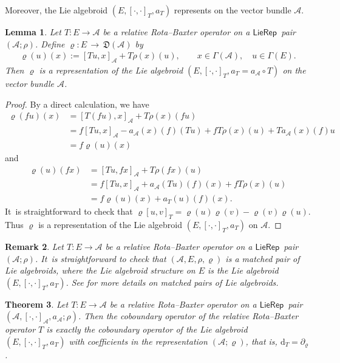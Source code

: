 \documentclass[10pt,a4paper]{amsart}
\numberwithin{equation}{section}
\newtheorem{thm}{Theorem}[section]
\newtheorem{lem}[thm]{Lemma}
\newtheorem{rmk}[thm]{Remark}
\newcommand{\huaA}{\mathcal{A}}
\newcommand{\frkD}{\mathfrak D}
\newcommand{\lon }{\,\rightarrow\,}
\newcommand{\dM}{\mathrm{d}}
\newcommand{\LP}{$\mathsf{LieRep}$~}
\begin{document}
Moreover, the Lie algebroid $(E, [\cdot,\cdot]_{T}, a_T)$ represents on the vector bundle $\huaA$.
\begin{lem}\label{ex:MC-ten}
 Let $T\colon E\longrightarrow \huaA$ be a relative Rota--Baxter operator on a \LP pair $(\huaA;\rho)$. Define $\varrho\colon E\lon\frkD(\huaA)$ by
\begin{gather*}%
\varrho(u)(x):=[Tu,x]_{\huaA}+T\rho(x)(u),\qquad x\in\Gamma{(\huaA)},\quad u\in\Gamma{(E)}.
\end{gather*}
Then $\varrho$ is a representation of the Lie algebroid $(E,[\cdot,\cdot]_{T},a_T=a_{\huaA}\circ T)$ on the vector bundle $\huaA$.
\end{lem}
\begin{proof}
By a direct calculation, we have
\begin{align*}
\varrho(fu)(x)&=[T(fu),x]_{\huaA}+T\rho(x)(fu)\\
&=f[Tu,x]_{\huaA}-a_{\huaA}(x)(f)(Tu)+fT\rho(x)(u)+Ta_{\huaA}(x)(f)u\\
&=f\varrho(u)(x)
\end{align*}
and
\begin{align*}
\varrho(u)(fx)&=[Tu,fx]_{\huaA}+T\rho(fx)(u)\\
&=f[Tu,x]_{\huaA}+a_{\huaA}(Tu)(f)(x)+fT\rho(x)(u)\\
&=f\varrho(u)(x)+a_{T}(u)(f)(x).
\end{align*}
It~is straightforward to check that $\varrho[u,v]_T=\varrho(u)\varrho(v)-\varrho(v)\varrho(u)$. Thus $\varrho$ is a representation of the Lie algebroid $(E,[\cdot,\cdot]_{T},a_T)$ on $\huaA$.
\end{proof}

\begin{rmk}
 Let $T\colon E\longrightarrow \huaA$ be a relative Rota--Baxter operator on a \LP pair $(\huaA;\rho)$. It~is straightforward to check that $(\huaA,E,\rho,\varrho)$ is a matched pair of Lie algebroids, where the Lie algebroid structure on $E$ is the Lie algebroid $(E,[\cdot,\cdot]_{T},a_T)$. See \cite{Mok} for more details on matched pairs of Lie algebroids.
\end{rmk}


{\sloppy\begin{thm}\label{pro:coboundary operator relation}
 Let $T\colon E\longrightarrow \huaA$ be a relative Rota--Baxter operator on a \LP pair $(\huaA,[\cdot,\cdot]_\huaA,a_\huaA;\rho)$. Then the coboundary operator of the relative Rota--Baxter operator $T$ is exactly the coboundary operator of the Lie algebroid $(E, [\cdot,\cdot]_{T}, a_T)$ with coefficients in the representation $(\huaA;\varrho)$, that is,
 $\dM_T=\partial_{\varrho}$.
\end{thm}}
\end{document}
